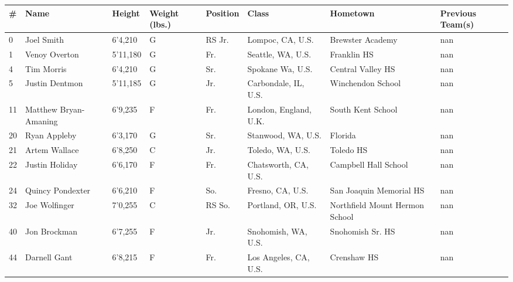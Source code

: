 \documentclass{article}
\begin{document}
\begin{tabular}{llllllll}
\toprule
\# & Name & Height & Weight (lbs.) & Position & Class & Hometown & Previous Team(s) \\
\midrule
0 & Joel Smith & 6'4,210 & G & RS Jr. & Lompoc, CA, U.S. & Brewster Academy & nan \\
1 & Venoy Overton & 5'11,180 & G & Fr. & Seattle, WA, U.S. & Franklin HS & nan \\
4 & Tim Morris & 6'4,210 & G & Sr. & Spokane Wa, U.S. & Central Valley HS & nan \\
5 & Justin Dentmon & 5'11,185 & G & Jr. & Carbondale, IL, U.S. & Winchendon School & nan \\
11 & Matthew Bryan-Amaning & 6'9,235 & F & Fr. & London, England, U.K. & South Kent School & nan \\
20 & Ryan Appleby & 6'3,170 & G & Sr. & Stanwood, WA, U.S. & Florida & nan \\
21 & Artem Wallace & 6'8,250 & C & Jr. & Toledo, WA, U.S. & Toledo HS & nan \\
22 & Justin Holiday & 6'6,170 & F & Fr. & Chatsworth, CA, U.S. & Campbell Hall School & nan \\
24 & Quincy Pondexter & 6'6,210 & F & So. & Fresno, CA, U.S. & San Joaquin Memorial HS & nan \\
32 & Joe Wolfinger & 7'0,255 & C & RS So. & Portland, OR, U.S. & Northfield Mount Hermon School & nan \\
40 & Jon Brockman & 6'7,255 & F & Jr. & Snohomish, WA, U.S. & Snohomish Sr. HS & nan \\
44 & Darnell Gant & 6'8,215 & F & Fr. & Los Angeles, CA, U.S. & Crenshaw HS & nan \\
\bottomrule
\end{tabular}
\end{document}

